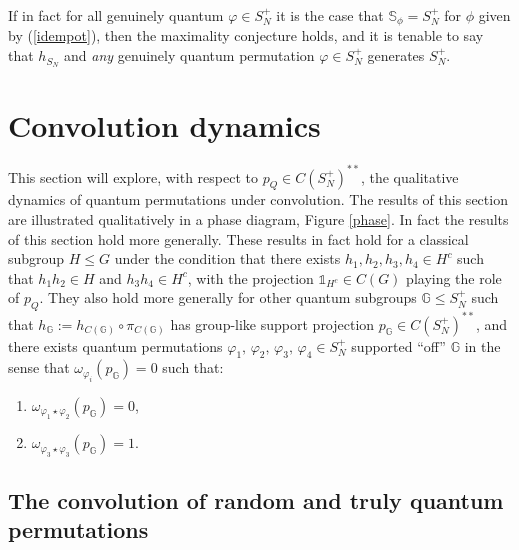 \documentclass[12pt]{amsart}
\theoremstyle{remark}
\theoremstyle{remark}
\begin{document}
If in fact for all genuinely quantum $\varphi\in S_N^+$ it is the case that $\mathbb{S}_{\phi}=S_N^+$ for $\phi$ given by (\ref{idempot}), then the maximality conjecture holds, and it is tenable to say that $h_{S_N}$ and \emph{any} genuinely quantum permutation $\varphi\in S_N^+$ generates  $S_N^+$.




\bigskip


\section{Convolution dynamics}
This section will explore, with respect to $p_Q\in C(S_N^+)^{**}$, the qualitative dynamics of quantum permutations under convolution.  The results of this section are  illustrated qualitatively in a phase diagram, Figure \ref{phase}. In fact the results of this section hold more generally. These results in fact hold for a classical subgroup $H\leq G$ under the condition that there exists $h_1,h_2,h_3,h_4\in H^c$ such that $h_1h_2\in H$ and $h_3h_4\in H^c$, with the  projection $\mathds{1}_{H^c}\in C(G)$ playing the role of $p_Q$.  They also hold more generally for other quantum subgroups $\mathbb{G}\leq S_N^+$  such that $h_{\mathbb{G}}:=h_{C(\mathbb{G})}\circ \pi_{C(\mathbb{G})}$ has group-like support projection $p_{\mathbb{G}}\in C(S_N^+)^{**}$, and there exists quantum permutations $\varphi_1,\,\varphi_2,\,\varphi_3,\,\varphi_4\in S_N^+$ supported  ``off'' $\mathbb{G}$  in the sense that $\omega_{\varphi_i}(p_{\mathbb{G}})=0$ such that:
  \begin{enumerate}
    \item[(i)] $\omega_{\varphi_1\star\varphi_2}(p_{\mathbb{G}})=0$,
    \item[(ii)] $\omega_{\varphi_3\star\varphi_3}(p_{\mathbb{G}})=1$.
  \end{enumerate}

\subsection{The convolution of random and truly quantum permutations}
\end{document}
